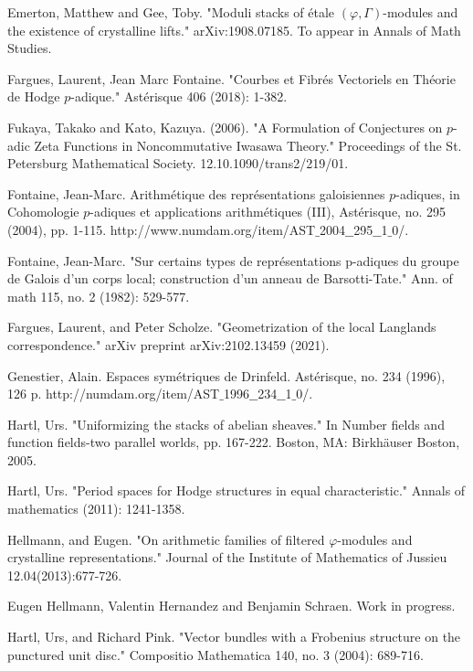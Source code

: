 \documentclass[12pt]{article}
\begin{document}
\begin{thebibliography}{}
 Emerton, Matthew and Gee, Toby. "Moduli stacks of \'etale $(\varphi,\Gamma)$-modules and the existence of crystalline lifts." arXiv:1908.07185. To appear in Annals of Math Studies.

 Fargues, Laurent, Jean Marc Fontaine. "Courbes et Fibr\'es Vectoriels en Th\'eorie de Hodge $p$-adique." Ast\'erisque 406 (2018): 1-382.

 Fukaya, Takako and Kato, Kazuya. (2006). "A Formulation of Conjectures on $p$-adic Zeta Functions in Noncommutative Iwasawa Theory." Proceedings of the St. Petersburg Mathematical Society. 12.10.1090/trans2/219/01.

 Fontaine, Jean-Marc. Arithm\'etique des repr\'esentations galoisiennes $p$-adiques, in Cohomologie $p$-adiques et applications arithm\'etiques (III), Ast\'erisque, no. 295 (2004), pp. 1-115. http://www.numdam.org/item/AST$\_$2004$\_$$\_$295$\_$$\_$1$\_$0/.

 Fontaine, Jean-Marc. "Sur certains types de repr\'esentations p-adiques du groupe de Galois d'un corps local; construction d'un anneau de Barsotti-Tate." Ann. of math 115, no. 2 (1982): 529-577.

 Fargues, Laurent, and Peter Scholze. "Geometrization of the local Langlands correspondence." arXiv preprint arXiv:2102.13459 (2021).

 Genestier, Alain. Espaces sym\'etriques de Drinfeld. Ast\'erisque, no. 234 (1996), 126 p. http://numdam.org/item/AST$\_$1996$\_\_$234$\_\_$1$\_$0/.

 Hartl, Urs. "Uniformizing the stacks of abelian sheaves." In Number fields and function fields-two parallel worlds, pp. 167-222. Boston, MA: Birkh\"auser Boston, 2005.

 Hartl, Urs. "Period spaces for Hodge structures in equal characteristic." Annals of mathematics (2011): 1241-1358.

 Hellmann, and Eugen. "On arithmetic families of filtered $\varphi$-modules and crystalline representations." Journal of the Institute of Mathematics of Jussieu 12.04(2013):677-726.

 Eugen Hellmann, Valentin Hernandez and Benjamin Schraen. Work in progress.

 Hartl, Urs, and Richard Pink. "Vector bundles with a Frobenius structure on the punctured unit disc." Compositio Mathematica 140, no. 3 (2004): 689-716.


\end{thebibliography}
\end{document}
